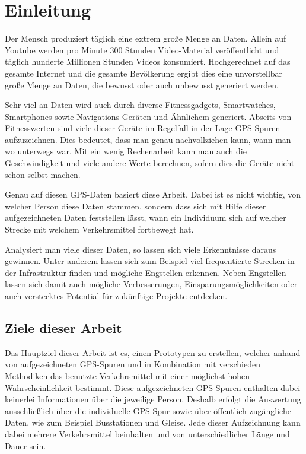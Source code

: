 \chapter{Einleitung}
Der Mensch produziert täglich eine extrem große Menge an Daten. Allein auf Youtube werden pro Minute 300 Stunden Video-Material veröffentlicht und täglich hunderte Millionen Stunden Videos konsumiert.  \cite{youtube_statistics_2015} Hochgerechnet auf das gesamte Internet und die gesamte Bevölkerung ergibt dies eine unvorstellbar große Menge an Daten, die bewusst oder auch unbewusst generiert werden. 

Sehr viel an Daten wird auch durch diverse Fitnessgadgets, Smartwatches, Smartphones sowie Navigations-Geräten und Ähnlichem generiert. Abseits von Fitnesswerten sind viele dieser Geräte im Regelfall in der Lage GPS-Spuren aufzuzeichnen. Dies bedeutet, dass man genau nachvollziehen kann, wann man wo unterwegs war. Mit ein wenig Rechenarbeit kann man auch die Geschwindigkeit und viele andere Werte berechnen, sofern dies die Geräte nicht schon selbst machen. 

Genau auf diesen GPS-Daten basiert diese Arbeit. Dabei ist es nicht wichtig, von welcher Person diese Daten stammen, sondern dass sich mit Hilfe dieser aufgezeichneten Daten feststellen lässt, wann ein Individuum sich auf welcher Strecke mit welchem Verkehrsmittel fortbewegt hat.

Analysiert man viele dieser Daten, so lassen sich viele Erkenntnisse daraus gewinnen. Unter anderem lassen sich zum Beispiel viel frequentierte Strecken in der Infrastruktur finden und mögliche Engstellen erkennen. Neben Engstellen lassen sich damit auch mögliche Verbesserungen, Einsparungsmöglichkeiten oder auch verstecktes Potential für zukünftige Projekte entdecken.

\section{Ziele dieser Arbeit}
Das Hauptziel dieser Arbeit ist es, einen Prototypen zu erstellen, welcher anhand von aufgezeichneten GPS-Spuren und in Kombination mit verschieden Methodiken das benutzte Verkehrsmittel mit einer möglichst hohen Wahrscheinlichkeit bestimmt. Diese aufgezeichneten GPS-Spuren enthalten dabei keinerlei Informationen über die jeweilige Person. Deshalb erfolgt die Auswertung ausschließlich über die individuelle GPS-Spur sowie über öffentlich zugängliche Daten, wie zum Beispiel Busstationen und Gleise. Jede dieser Aufzeichnung kann dabei mehrere Verkehrsmittel beinhalten und von unterschiedlicher Länge und Dauer sein.

